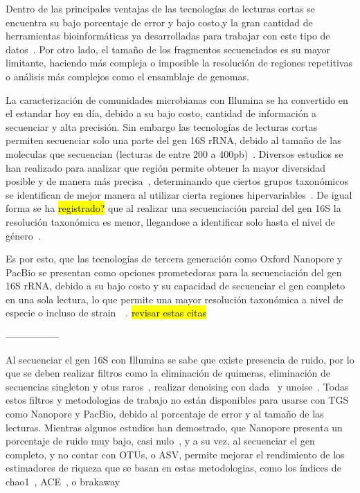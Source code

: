 Dentro de las principales ventajas de las tecnologías de lecturas cortas se encuentra su bajo porcentaje de error y bajo costo,y la gran cantidad de herramientas bioinformáticas ya desarrolladas para trabajar con este tipo de datos~\cite{heather2016sequence}. Por otro lado, el tamaño de los fragmentos secuenciados es su mayor limitante, haciendo más compleja o imposible la resolución de regiones repetitivas o análisis más complejos como el ensamblaje de genomas.


La caracterización de comunidades microbianas con Illumina se ha convertido en el estandar hoy en día, debido a su bajo costo, cantidad de información a secuenciar y alta precisión. Sin embargo las tecnologías de lecturas cortas permiten secuenciar solo una parte del gen 16S rRNA, debido al tamaño de las moleculas que secuencian (lecturas de entre 200 a 400pb)~\cite{salipante2014performance}. 
Diversos estudios se han realizado para analizar que región permite obtener la mayor diversidad posible y de manera más precisa~\cite{liu2008accurate,schloss2011reducing}, determinando que ciertos grupos taxonómicos se identifican de mejor manera al utilizar cierta regiones hipervariables~\cite{he2013comparison,claesson2010comparison}. De igual forma se ha \hl{registrado?} que al realizar una secuenciación parcial del gen 16S la resolución taxonómica es menor, llegandose a identificar solo hasta el nivel de género~\cite{liu2008accurate}.
 
Es por esto, que las tecnologías de tercera generación como Oxford Nanopore y PacBio se presentan como opciones prometedoras para la secuenciación del gen 16S rRNA, debido a su bajo costo y su capacidad de secuenciar el gen completo en una sola lectura, lo que permite una mayor resolución taxonómica a nivel de especie o incluso de strain~\cite{szoboszlay2023nanopore}~\cite{urban2021freshwater,delahaye2021sequencing}. \hl{revisar estas citas}

-----------------



Al secuenciar el gen 16S con Illumina se sabe que existe presencia de ruido, por lo que se deben realizar filtros como la eliminación de quimeras, eliminación de secuencias singleton y otus raros~\cite{caporaso2011global,auer2017analysis}, realizar denoising con dada~\cite{callahan2016dada2} y unoise~\cite{edgar2016unoise2}. Todas estos filtros y metodologias de trabajo no están disponibles para usarse con TGS como Nanopore y PacBio, debido al porcentaje de error y al tamaño de las lecturas.
Mientras algunos estudios han demostrado, que Nanopore presenta un porcentaje de ruido muy bajo, casi nulo~\cite{szoboszlay2023nanopore}, y a su vez, al secuenciar el gen completo, y no contar con OTUs, o ASV, permite mejorar el rendimiento de los estimadores de riqueza que se basan en estas metodologias, como los índices de chao1~\cite{chao1984nonparametric}, ACE~\cite{chao1992estimating}, o brakaway~\cite{willis2015estimating}


